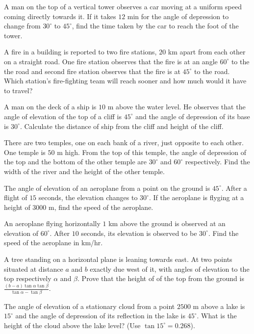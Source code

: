 \item A man on the top of a vertical tower observes a car  moving at a uniform speed coming directly towards it. If it takes
  $12$ min for the angle of depression to change from $30^\circ$ to $45^\circ$, find the time taken by the car
  to reach the foot of the tower.

\item A fire in a building is reported to two fire stations, $20$ km apart from each other on a straight road. One fire
  station observes that the fire is at an angle $60^\circ$ to the the road and second fire station observes that the fire
  is at $45^\circ$ to the road. Which station's fire-fighting team will reach sooner and how much would it have to travel?

\item A man on the deck of a ship is $10$ m above the water level. He observes that the angle of elevation of the top of a
  cliff is $45^\circ$ and the angle of depression of its base is $30^\circ$. Calculate the distance of ship from the
  cliff and height of the cliff.

\item There are two temples, one on each bank of a river, just opposite to each other. One temple is $50$ m high. From the top
  of this temple, the angle of depression of the top and the bottom of the other temple are $30^\circ$ and
  $60^\circ$ respectively. Find the width of the river and the height of the other temple.

\item The angle of elevation of an aeroplane from a point on the ground is $45^\circ$. After a flight of $15$ seconds,
  the elevation changes to $30^\circ$. If the aeroplane is flyging at a height of $3000$ m, find the speed of the
  aeroplane.

\item An aeroplane flying horizontally $1$ km above the ground  is observed at an elevation of $60^\circ$. After
  $10$ seconds, its elevation is observed to be $30^\circ$. Find the speed of the aeroplane in km/hr.

\item A tree standing on a horizontal plane is leaning towards east. At two points situated at distance $a$ and $b$
  exactly due west of it, with angles of elevation to the top respectively $\alpha$ and $\beta$. Prove that the
  height of of the top from the ground is $\frac{(b - a)\tan\alpha\tan\beta}{\tan\alpha - \tan\beta}$.

\item The angle of elevation of a stationary cloud from a point $2500$ m above a lake is $15^\circ$ and the angle of
  depression of its reflection in the lake is $45^\circ$. What is the height of the cloud above the lake level? (Use
  $\tan15^\circ = 0.268$).

